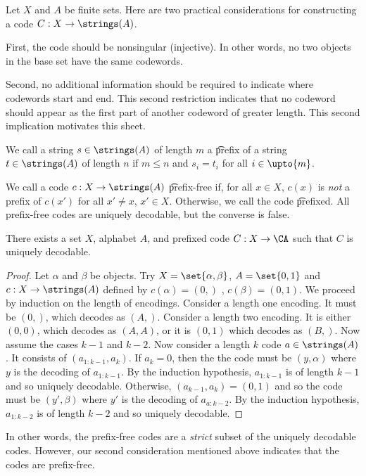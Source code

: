 

Let $X$ and $A$ be finite sets.
Here are two practical considerations for constructing a code $C: X \to \strings(A)$.

First, the code should be nonsingular (injective).
In other words, no two objects in the base set have the same codewords.

Second, no additional information should be required to indicate where codewords start and end.
This second restriction indicates that no codeword should appear as the first part of another codeword of greater length.
This second implication motivates this sheet.


We call a string $s \in \strings(A)$ of length $m$ a \t{prefix} of a string $t \in \strings(A)$ of length $n$ if $m \leq n$ and $s_i = t_i$ for all $i \in \upto{m}$.

We call a code $c: X \to \strings(A)$ \t{prefix-free} if, for all $x \in X$, $c(x)$ is \textit{not} a prefix of $c(x')$ for all $x' \neq x$, $x' \in X$.
Otherwise, we call the code \t{prefixed}.
All prefix-free codes are uniquely decodable, but the converse is false.

\begin{proposition}
  There exists a set $X$, alphabet $A$, and prefixed code $C: X \to \CA$ such that $C$ is uniquely decodable.
  \begin{proof}
  Let $\alpha$ and $\beta$ be objects.
    Try $X = \set{\alpha, \beta}$, $A = \set{0, 1}$ and $c: X \to \strings(A)$ defined by $c(\alpha) = (0,)$ , $c(\beta) = (0,1)$.
  We proceed by induction on the length of encodings.
  Consider a length one encoding.
  It must be $(0,)$, which decodes as $(A,)$.
  Consider a length two encoding.
  It is either $(0,0)$, which decodes as $(A,A)$, or it is $(0,1)$ which decodes as $(B,)$.
  Now assume the cases $k-1$ and $k-2$.
  Now consider a length $k$ code $a \in \strings(A)$.
  It consists of $(a_{1:k-1},a_k)$.
  If $a_k = 0$, then the the code must be $(y, \alpha)$ where $y$ is the decoding of $a_{1:k-1}$.
  By the induction hypothesis, $a_{1:k-1}$ is of length $k-1$ and so uniquely decodable.
  Otherwise, $(a_{k-1}, a_k) = (0,1)$ and so the code must be $(y', \beta)$ where $y'$ is the decoding of $a_{a:k-2}$.
  By the induction hypothesis, $a_{1:k-2}$ is of length $k-2$ and so uniquely decodable.
  \end{proof}
\end{proposition}

In other words, the prefix-free codes are a \textit{strict} subset of the uniquely decodable codes.
However, our second consideration mentioned above indicates that the  codes are prefix-free.

\blankpage
